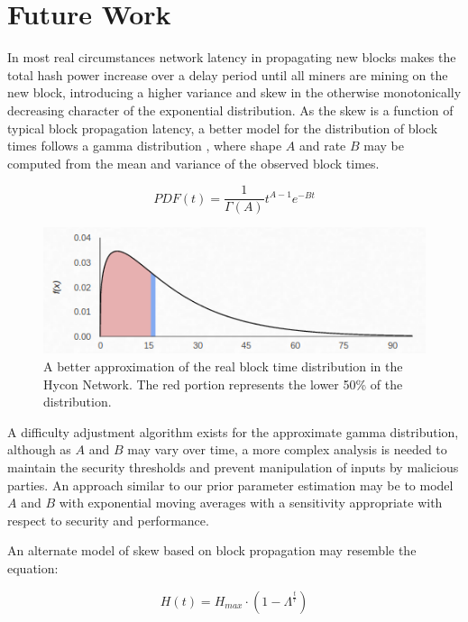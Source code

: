 \documentclass[]{article}
\begin{document}
\section{Future Work}
In most real circumstances network latency in propagating new blocks makes the total hash power increase over a delay period until all miners are mining on the new block, introducing a higher variance and skew in the otherwise monotonically decreasing character of the exponential distribution.  As the skew is a function of typical block propagation latency, a better model for the distribution of block times follows a gamma distribution \cite{GammaDistDefinition}, where shape $A$ and rate $B$ may be computed from the mean and variance of the observed block times.  

\begin{equation}
PDF(t) = \frac{1}{\Gamma(A)} t^{A - 1}e^{-Bt}
\end{equation}

\begin{figure}[h]
	\centering
	\includegraphics[width=0.7\linewidth]{"./real hycon"}
	\caption{\footnotesize A better approximation of the real block time distribution in the Hycon Network. The red portion represents the lower 50\% of the distribution. \cite{GammaDistHycon}}
\end{figure}

A difficulty adjustment algorithm exists for the approximate gamma distribution, although as $A$ and $B$ may vary over time, a more complex analysis is needed to maintain the security thresholds and prevent manipulation of inputs by malicious parties.  An approach similar to our prior parameter estimation may be to model $A$ and $B$ with exponential moving averages with a sensitivity appropriate with respect to security and performance.  
\newline

An alternate model of skew based on block propagation may resemble the equation: 

\begin{equation}
	H(t) = H_{max} \cdot (1 - \Lambda^\frac{t}{\tau})
\end{equation}
\end{document}
